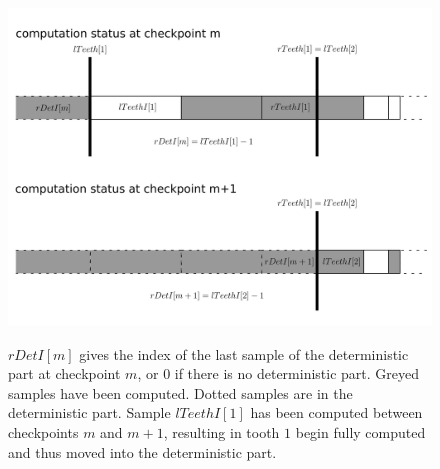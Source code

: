 \documentclass[./thesis.tex]{subfiles}
\begin{document}
\begin{figure}[h!]
	\begin{center}
		\includegraphics[width=1.00\columnwidth]{figures/matrix_dressing/deterministic_cp}
		\caption{\label{filtering}}
		$rDetI[m]$ gives the index of the last sample of the deterministic part at checkpoint $m$, or $0$ if there is no deterministic part.
		Greyed samples have been computed. Dotted samples are in the deterministic part. Sample $lTeethI[1]$ has been computed between checkpoints $m$ and $m+1$, resulting in tooth $1$ begin fully computed and thus moved into the deterministic part.
	\end{center}
\end{figure}
\end{document}
